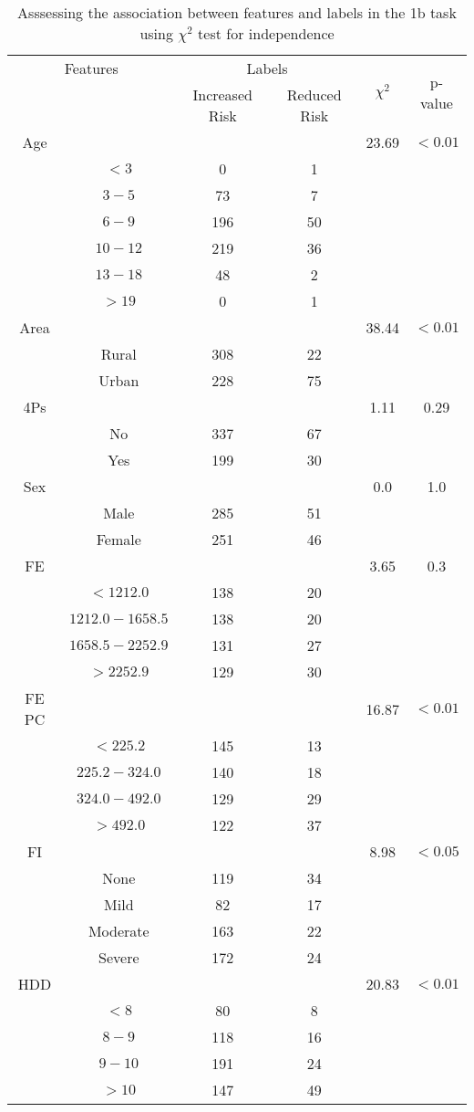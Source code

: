 \begin{table}[!htb]
\centering
\caption{Asssessing the association between features and labels in the 1b task using $\chi^2$ test for independence}
\label{tab:chitest_1b}
\begin{tabular}{c c | c c| c | c}
\hline
\multicolumn{2}{c|}{Features}& \multicolumn{2}{c|}{Labels}& \multirow{2}{*}{$\chi^2$} & \multirow{2}{*}{p-value}\\ 
& & Increased Risk & Reduced Risk & & \\ 
\hline
Age &  &  & & 23.69 & $< 0.01$ \\ 
& $< 3$ & 0 & 1& & \\ 
& $3-5$ & 73 & 7& & \\ 
& $6-9$ & 196 & 50& & \\ 
& $10-12$ & 219 & 36& & \\ 
& $13-18$ & 48 & 2& & \\ 
& $> 19$ & 0 & 1& & \\ 
\hline 
Area &  &  & & 38.44 & $< 0.01$ \\ 
& Rural & 308 & 22& & \\ 
& Urban & 228 & 75& & \\ 
\hline 
4Ps &  &  & & 1.11 & 0.29 \\ 
& No & 337 & 67& & \\ 
& Yes & 199 & 30& & \\ 
\hline 
Sex &  &  & & 0.0 & 1.0 \\ 
& Male & 285 & 51& & \\ 
& Female & 251 & 46& & \\ 
\hline 
FE &  &  & & 3.65 & 0.3 \\ 
& $< 1212.0$ & 138 & 20& & \\ 
& $1212.0-1658.5$ & 138 & 20& & \\ 
& $1658.5-2252.9$ & 131 & 27& & \\ 
& $> 2252.9$ & 129 & 30& & \\ 
\hline 
FE PC &  &  & & 16.87 & $< 0.01$ \\ 
& $< 225.2$ & 145 & 13& & \\ 
& $225.2-324.0$ & 140 & 18& & \\ 
& $324.0-492.0$ & 129 & 29& & \\ 
& $> 492.0$ & 122 & 37& & \\ 
\hline 
FI &  &  & & 8.98 & $< 0.05$ \\ 
& None & 119 & 34& & \\ 
& Mild & 82 & 17& & \\ 
& Moderate & 163 & 22& & \\ 
& Severe & 172 & 24& & \\ 
\hline 
HDD &  &  & & 20.83 & $< 0.01$ \\ 
& $< 8$ & 80 & 8& & \\ 
& $8-9$ & 118 & 16& & \\ 
& $9-10$ & 191 & 24& & \\ 
& $> 10$ & 147 & 49& & \\ 
\hline 
\end{tabular}
\end{table}
